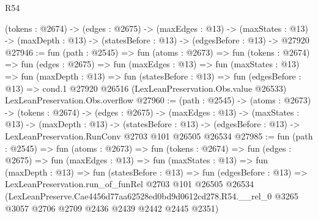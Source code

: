 \begin{lexlean}{R54}
\begin{coremodule}
  (tokens : @2674) ->
  (edges : @2675) ->
  (maxEdges : @13) ->
  (maxStates : @13) -> (maxDepth : @13) -> (statesBefore : @13) -> (edgesBefore : @13) -> @27920
@27946 := fun (path : @2545) =>
  fun (atoms : @2673) =>
  fun (tokens : @2674) =>
  fun (edges : @2675) =>
  fun (maxEdges : @13) =>
  fun (maxStates : @13) =>
  fun (maxDepth : @13) =>
  fun (statesBefore : @13) =>
  fun (edgesBefore : @13) =>
  cond.{1} @27920 @26516 (LexLeanPreservation.Obs.value @26533) LexLeanPreservation.Obs.overflow
@27960 := (path : @2545) ->
  (atoms : @2673) ->
  (tokens : @2674) ->
  (edges : @2675) ->
  (maxEdges : @13) ->
  (maxStates : @13) ->
  (maxDepth : @13) ->
  (statesBefore : @13) ->
  (edgesBefore : @13) -> LexLeanPreservation.RunConv @2703 @101 @26505 @26534
@27985 := fun (path : @2545) =>
  fun (atoms : @2673) =>
  fun (tokens : @2674) =>
  fun (edges : @2675) =>
  fun (maxEdges : @13) =>
  fun (maxStates : @13) =>
  fun (maxDepth : @13) =>
  fun (statesBefore : @13) =>
  fun (edgesBefore : @13) =>
  LexLeanPreservation.run_of_funRel
    @2703
    @101
    @26505
    @26534
    (LexLeanPreserve.Cae4456d77aa62528ed0bd9d0612cd278.R54.__rel_0
      @3265
      @3057
      @2706
      @2709
      @2436
      @2439
      @2442
      @2445
      @2351)
\end{coremodule}
\end{lexlean}
